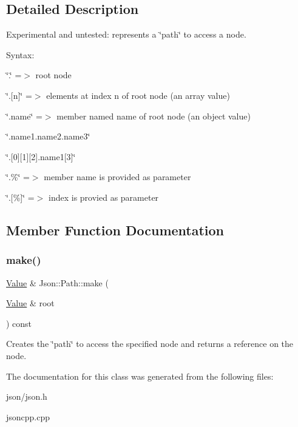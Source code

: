 \subsection{Detailed Description}
Experimental and untested\+: represents a \char`\"{}path\char`\"{} to access a node. 

Syntax\+:
\begin{DoxyItemize}
\item \char`\"{}.\char`\"{} =$>$ root node
\item \char`\"{}.\mbox{[}n\mbox{]}\char`\"{} =$>$ elements at index \textquotesingle{}n\textquotesingle{} of root node (an array value)
\item \char`\"{}.\+name\char`\"{} =$>$ member named \textquotesingle{}name\textquotesingle{} of root node (an object value)
\item \char`\"{}.\+name1.\+name2.\+name3\char`\"{}
\item \char`\"{}.\mbox{[}0\mbox{]}\mbox{[}1\mbox{]}\mbox{[}2\mbox{]}.\+name1\mbox{[}3\mbox{]}\char`\"{}
\item \char`\"{}.\%\char`\"{} =$>$ member name is provided as parameter
\item \char`\"{}.\mbox{[}\%\mbox{]}\char`\"{} =$>$ index is provied as parameter 
\end{DoxyItemize}

\subsection{Member Function Documentation}
\mbox{\label{classJson_1_1Path_a858f9426f0f7bbe0450644d72b44e26b}} 
\subsubsection{\texorpdfstring{make()}{make()}}
{\footnotesize\ttfamily \hyperlink{classJson_1_1Value}{Value} \& Json\+::\+Path\+::make (\begin{DoxyParamCaption}\item[{\hyperlink{classJson_1_1Value}{Value} \&}]{root }\end{DoxyParamCaption}) const}

Creates the \char`\"{}path\char`\"{} to access the specified node and returns a reference on the node. 

The documentation for this class was generated from the following files\+:\begin{DoxyCompactItemize}
\item 
json/json.\+h\item 
jsoncpp.\+cpp\end{DoxyCompactItemize}
